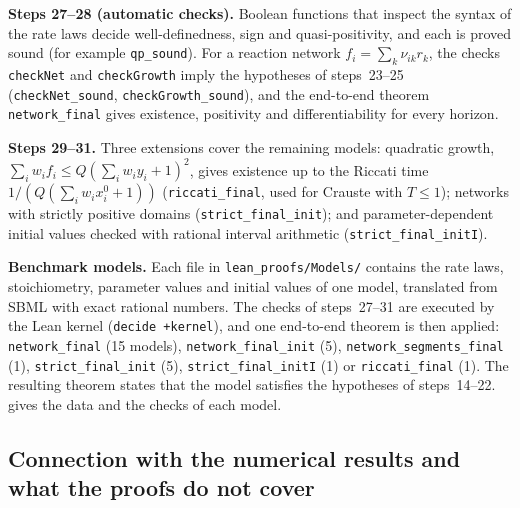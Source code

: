 \textbf{Steps 27--28 (automatic checks).} Boolean functions that inspect the syntax of the rate laws decide well-definedness, sign and quasi-positivity, and each is proved sound (for example \texttt{qp\_sound}). For a reaction network $f_i=\sum_k\nu_{ik}r_k$, the checks \texttt{checkNet} and \texttt{checkGrowth} imply the hypotheses of steps~23--25 (\texttt{checkNet\_sound}, \texttt{checkGrowth\_sound}), and the end-to-end theorem \texttt{network\_final} gives existence, positivity and differentiability for every horizon.

\textbf{Steps 29--31.} Three extensions cover the remaining models: quadratic growth, $\sum_iw_if_i\le Q(\sum_iw_iy_i+1)^2$, gives existence up to the Riccati time $1/(Q(\sum_iw_ix^0_i+1))$ (\texttt{riccati\_final}, used for Crauste with $T\le1$); networks with strictly positive domains (\texttt{strict\_final\_init}); and parameter-dependent initial values checked with rational interval arithmetic (\texttt{strict\_final\_initI}).

\textbf{Benchmark models.} Each file in \texttt{lean\_proofs/Models/} contains the rate laws, stoichiometry, parameter values and initial values of one model, translated from SBML with exact rational numbers. The checks of steps~27--31 are executed by the Lean kernel (\texttt{decide +kernel}), and one end-to-end theorem is then applied: \texttt{network\_final} (15 models), \texttt{network\_final\_init} (5), \texttt{network\_segments\_final} (1), \texttt{strict\_final\_init} (5), \texttt{strict\_final\_initI} (1) or \texttt{riccati\_final} (1). The resulting theorem states that the model satisfies the hypotheses of steps~14--22.  gives the data and the checks of each model.

\subsection*{Connection with the numerical results and what the proofs do not cover}

